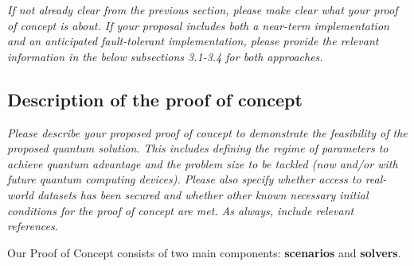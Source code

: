 \documentclass{oqireport}
\begin{document}
\textit{
If not already clear from the previous section, please make clear what your proof of concept is about. 
If your proposal includes both a near-term implementation and an anticipated fault-tolerant implementation, please provide the relevant information in the below subsections 3.1-3.4 for both approaches.
}

\subsection{Description of the proof of concept}

\textit{
Please describe your proposed proof of concept to demonstrate the feasibility of the proposed quantum solution. This includes defining the regime of parameters to achieve quantum advantage and the problem size to be tackled (now and/or with future quantum computing devices). Please also specify whether access to real-world datasets has been secured and whether other known necessary initial conditions for the proof of concept are met. As always, include relevant references.
}


Our Proof of Concept consists of two main components: \textbf{scenarios} and \textbf{solvers}.
\end{document}
